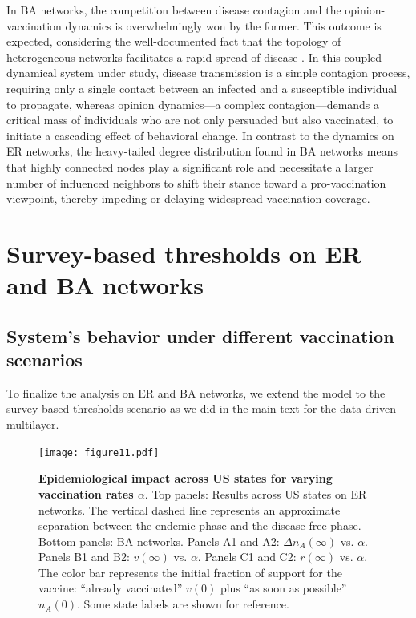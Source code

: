 \documentclass[
 reprint,
 amsmath,amssymb,
 aps,
]{revtex4-2}
\begin{document}
In BA networks, the competition between disease contagion and the opinion-vaccination dynamics is overwhelmingly won by the former. This outcome is expected, considering the well-documented fact that the topology of heterogeneous networks facilitates a rapid spread of disease \cite{moreno2002epidemic}. In this coupled dynamical system under study, disease transmission is a simple contagion process, requiring only a single contact between an infected and a susceptible individual to propagate, whereas opinion dynamics—a complex contagion—demands a critical mass of individuals who are not only persuaded but also vaccinated, to initiate a cascading effect of behavioral change. In contrast to the dynamics on ER networks, the heavy-tailed degree distribution found in BA networks means that highly connected nodes play a significant role and necessitate a larger number of influenced neighbors to shift their stance toward a pro-vaccination viewpoint, thereby impeding or delaying widespread vaccination coverage.

\section{Survey-based thresholds on ER and BA networks}
\label{app:heterogeneous_erba}

\setcounter{figure}{0}

\subsection{System's behavior under different vaccination scenarios}
\label{subapp:heterogeneous_erba_impact}

To finalize the analysis on ER and BA networks, we extend the model to the survey-based thresholds scenario as we did in the main text for the data-driven multilayer.

\begin{figure}[!ht]
\centering
\texttt{[image: figure11.pdf]}
\caption[Epidemiological impact across US states for varying vaccination rates $\alpha$]{\textbf{Epidemiological impact across US states for varying vaccination rates $\alpha$}. Top panels: Results across US states on ER networks. The vertical dashed line represents an approximate separation between the endemic phase and the disease-free phase. Bottom panels: BA networks. Panels A1 and A2: $\Delta n_A(\infty)$ vs. $\alpha$. Panels B1 and B2: $v(\infty)$ vs. $\alpha$. Panels C1 and C2: $r(\infty)$ vs. $\alpha$. The color bar represents the initial fraction of support for the vaccine: ``already vaccinated'' $v(0)$ plus ``as soon as possible'' $n_A(0)$. Some state labels are shown for reference.}
\label{fig:supp_vaccination}
\end{figure}
\end{document}
